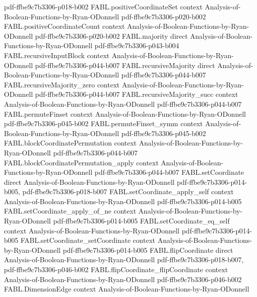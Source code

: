 \begin{theorem}
  {pdf-ffbe9c7b3306-p018-b002}
\proofstep
  {FABL.positiveCoordinateSet}
  {context}
  {Analysis-of-Boolean-Functions-by-Ryan-ODonnell}
  {pdf-ffbe9c7b3306-p020-b002}
\proofstep
  {FABL.positiveCoordinateCount}
  {context}
  {Analysis-of-Boolean-Functions-by-Ryan-ODonnell}
  {pdf-ffbe9c7b3306-p020-b002}
\proofstep
  {FABL.majority}
  {direct}
  {Analysis-of-Boolean-Functions-by-Ryan-ODonnell}
  {pdf-ffbe9c7b3306-p043-b004}
\proofstep
  {FABL.recursiveInputBlock}
  {context}
  {Analysis-of-Boolean-Functions-by-Ryan-ODonnell}
  {pdf-ffbe9c7b3306-p044-b007}
\proofstep
  {FABL.recursiveMajority}
  {direct}
  {Analysis-of-Boolean-Functions-by-Ryan-ODonnell}
  {pdf-ffbe9c7b3306-p044-b007}
\proofstep
  {FABL.recursiveMajority_zero}
  {context}
  {Analysis-of-Boolean-Functions-by-Ryan-ODonnell}
  {pdf-ffbe9c7b3306-p044-b007}
\proofstep
  {FABL.recursiveMajority_succ}
  {context}
  {Analysis-of-Boolean-Functions-by-Ryan-ODonnell}
  {pdf-ffbe9c7b3306-p044-b007}
\proofstep
  {FABL.permuteFinset}
  {context}
  {Analysis-of-Boolean-Functions-by-Ryan-ODonnell}
  {pdf-ffbe9c7b3306-p045-b002}
\proofstep
  {FABL.permuteFinset_symm}
  {context}
  {Analysis-of-Boolean-Functions-by-Ryan-ODonnell}
  {pdf-ffbe9c7b3306-p045-b002}
\proofstep
  {FABL.blockCoordinatePermutation}
  {context}
  {Analysis-of-Boolean-Functions-by-Ryan-ODonnell}
  {pdf-ffbe9c7b3306-p044-b007}
\proofstep
  {FABL.blockCoordinatePermutation_apply}
  {context}
  {Analysis-of-Boolean-Functions-by-Ryan-ODonnell}
  {pdf-ffbe9c7b3306-p044-b007}
\proofstep
  {FABL.setCoordinate}
  {direct}
  {Analysis-of-Boolean-Functions-by-Ryan-ODonnell}
  {pdf-ffbe9c7b3306-p014-b005,
    pdf-ffbe9c7b3306-p018-b007}
\proofstep
  {FABL.setCoordinate_apply_self}
  {context}
  {Analysis-of-Boolean-Functions-by-Ryan-ODonnell}
  {pdf-ffbe9c7b3306-p014-b005}
\proofstep
  {FABL.setCoordinate_apply_of_ne}
  {context}
  {Analysis-of-Boolean-Functions-by-Ryan-ODonnell}
  {pdf-ffbe9c7b3306-p014-b005}
\proofstep
  {FABL.setCoordinate_eq_self}
  {context}
  {Analysis-of-Boolean-Functions-by-Ryan-ODonnell}
  {pdf-ffbe9c7b3306-p014-b005}
\proofstep
  {FABL.setCoordinate_setCoordinate}
  {context}
  {Analysis-of-Boolean-Functions-by-Ryan-ODonnell}
  {pdf-ffbe9c7b3306-p014-b005}
\proofstep
  {FABL.flipCoordinate}
  {direct}
  {Analysis-of-Boolean-Functions-by-Ryan-ODonnell}
  {pdf-ffbe9c7b3306-p018-b007,
    pdf-ffbe9c7b3306-p046-b002}
\proofstep
  {FABL.flipCoordinate_flipCoordinate}
  {context}
  {Analysis-of-Boolean-Functions-by-Ryan-ODonnell}
  {pdf-ffbe9c7b3306-p046-b002}
\proofstep
  {FABL.DimensionEdge}
  {context}
  {Analysis-of-Boolean-Functions-by-Ryan-ODonnell}

\end{theorem}
